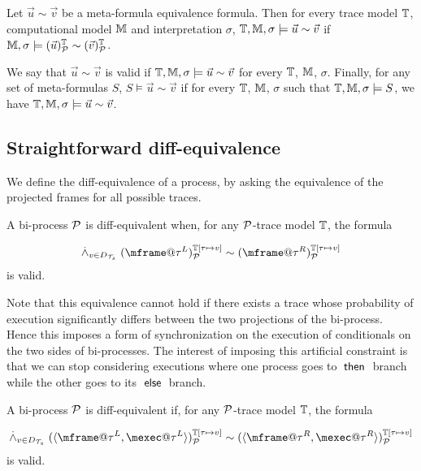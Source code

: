 \begin{definition}
  Let $\vec{u} \sim \vec{v}$ be a meta-formula equivalence formula. Then for every trace model $\mathbb{T}$, computational model $\mathbb{M}$ and interpretation $\sigma$, $\mathbb{T}, \mathbb{M}, \sigma \models \vec{u} \sim \vec{v}$ if $\mathbb{M}, \sigma \models (\vec{u})^{\mathbb{T}}_{\mathcal{P}} \sim (\vec{v})^{\mathbb{T}}_{\mathcal{P}}$.

  We say that $\vec{u} \sim \vec{v}$ is valid if $\mathbb{T}, \mathbb{M}, \sigma \models \vec{u} \sim \vec{v}$ for every $\mathbb{T}$, $\mathbb{M}$, $\sigma$. Finally, for any set of meta-formulas $S$, $S \models \vec{u} \sim \vec{v}$ if for every $\mathbb{T}$, $\mathbb{M}$, $\sigma$ such that $\mathbb{T}, \mathbb{M}, \sigma \models S$, we have $\mathbb{T}, \mathbb{M}, \sigma \models \vec{u} \sim \vec{v}$.
\end{definition}

\subsection{Straightforward diff-equivalence}

We define the diff-equivalence of a process, by asking the equivalence of the projected frames for all possible traces.

\begin{definition}
  \label{def:process-equiv}
  A bi-process $\mathcal{P}$ is diff-equivalent when,
  for any $\mathcal{P}$-trace model $\mathbb{T}$, the formula

  \[
    \dand_{v\in D_\XT}
    \interp{\mframe@\tau^L}{\TM[\tau\mapsto v]}{\calp}
    \sim
    \interp{\mframe@\tau^R}{\TM[\tau \mapsto v]}{\calp}
  \]
  is valid.
\end{definition}
Note that this equivalence cannot hold if there exists a trace
whose probability of execution significantly differs between the two
projections of the bi-process.
Hence this imposes a form of synchronization on the execution of
conditionals on the two sides of bi-processes.
The interest of imposing this artificial constraint is that we
can stop considering executions where one process goes to $\;\textsf{then}\;$
branch while the other goes to its $\;\textsf{else}\;$ branch. 
\begin{lemma}
  A bi-process $\mathcal{P}$ is diff-equivalent if,
  for any $\mathcal{P}$-trace model $\mathbb{T}$, the formula

  \[
    \dand_{v\in D_\XT}
    \interp{\pair{\mframe@\tau^L,\mexec@\tau^L}}{\TM[\tau\mapsto v]}{\calp}
    \sim
    \interp{\pair{\mframe@\tau^R, \mexec@\tau^R}}{\TM[\tau \mapsto v]}{\calp}
  \]
  is valid.
\end{lemma}

